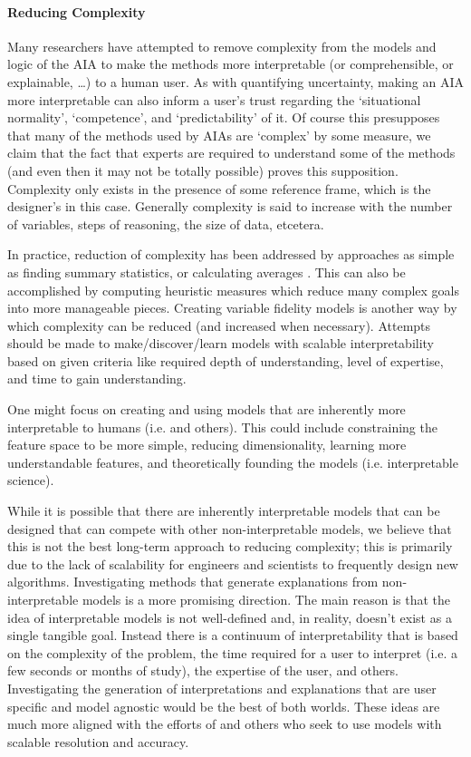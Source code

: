     \paragraph{Reducing Complexity} Many researchers have attempted to remove complexity from the models and logic of the AIA to make the methods more interpretable (or comprehensible, or explainable, \ldots) to a human user. As with quantifying uncertainty, making an AIA more interpretable can also inform a user's trust regarding the `situational normality', `competence', and `predictability' of it. Of course this presupposes that many of the methods used by AIAs are `complex' by some measure, we claim that the fact that experts are required to understand some of the methods (and even then it may not be totally possible) proves this supposition. Complexity only exists in the presence of some reference frame, which is the designer's in this case. Generally complexity is said to increase with the number of variables, steps of reasoning, the size of data, etcetera.

    In practice, reduction of complexity has been addressed by approaches as simple as finding summary statistics, or calculating averages \cite{Muir1994-ow,Muir1996-gt}. This can also be accomplished by computing heuristic measures which reduce many complex goals into more manageable pieces\cite{Aitken2016-fb}. Creating variable fidelity models is another way by which complexity can be reduced (and increased when necessary). Attempts should be made to make/discover/learn models with scalable interpretability based on given criteria like required depth of understanding, level of expertise, and time to gain understanding.
    
    One might focus on creating and using models that are inherently more interpretable to humans (i.e. \cite{Caruana2015-za} and others). This could include constraining the feature space to be more simple, reducing dimensionality, learning more understandable features, and theoretically founding the models (i.e. interpretable science).
    
    While it is possible that there are inherently interpretable models that can be designed that can compete with other non-interpretable models, we believe that this is not the best long-term approach to reducing complexity; this is primarily due to the lack of scalability for engineers and scientists to frequently design new algorithms. Investigating methods that generate explanations from non-interpretable models is a more promising direction. The main reason is that the idea of interpretable models is not well-defined and, in reality, doesn't exist as a single tangible goal. Instead there is a continuum of interpretability that is based on the complexity of the problem, the time required for a user to interpret (i.e. a few seconds or months of study), the expertise of the user, and others. Investigating the generation of interpretations and explanations that are user specific and model agnostic would be the best of both worlds. These ideas are much more aligned with the efforts of \cite{Ruping2006-xj} and others who seek to use models with scalable resolution and accuracy.

